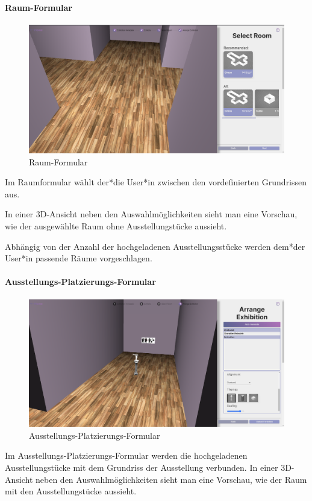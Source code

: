 \paragraph{Raum-Formular}
\begin{figure}[ht]
    \centering
    \includegraphics[scale=0.2]{pics/selectroom_formular.png}
    \caption{Raum-Formular}
\end{figure}
Im Raumformular wählt der*die User*in zwischen den vordefinierten Grundrissen aus.

In einer 3D-Ansicht neben den Auswahlmöglichkeiten sieht man eine Vorschau, wie der ausgewählte Raum ohne Ausstellungstücke aussieht. 

Abhängig von der Anzahl der hochgeladenen Ausstellungsstücke werden dem*der User*in passende Räume vorgeschlagen.

\paragraph{Ausstellungs-Platzierungs-Formular}
\begin{figure}[ht]
    \centering
    \includegraphics[scale=0.2]{pics/platzieren_formualr.png}
    \caption{Ausstellungs-Platzierungs-Formular}
\end{figure}
Im Ausstellungs-Platzierungs-Formular werden die hochgeladenen Ausstellungstücke mit dem Grundriss der Ausstellung verbunden.  In einer 3D-Ansicht neben den Auswahlmöglichkeiten sieht man eine Vorschau, wie der Raum mit den Ausstellungstücke aussieht. 

